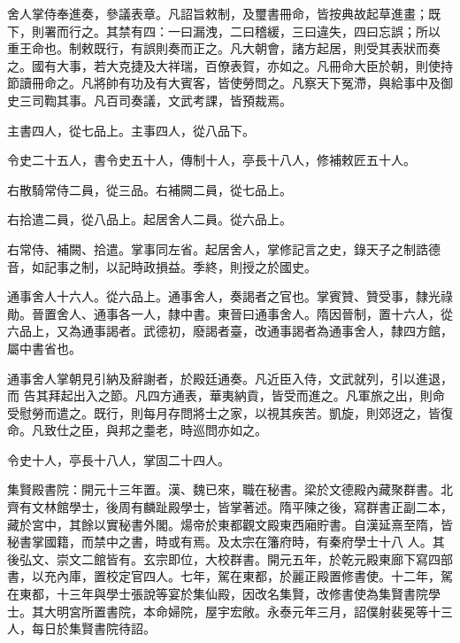 \begin{pinyinscope}
 舍人掌侍奉進奏，參議表章。凡詔旨敕制，及璽書冊命，皆按典故起草進畫；既下，則署而行之。其禁有四：一曰漏洩，二曰稽緩，三曰違失，四曰忘誤；所以
 重王命也。制敕既行，有誤則奏而正之。凡大朝會，諸方起居，則受其表狀而奏之。國有大事，若大克捷及大祥瑞，百僚表賀，亦如之。凡冊命大臣於朝，則使持節讀冊命之。凡將帥有功及有大賓客，皆使勞問之。凡察天下冤滯，與給事中及御史三司鞫其事。凡百司奏議，文武考課，皆預裁焉。



 主書四人，從七品上。主事四人，從八品下。



 令史二十五人，書令史五十人，傳制十人，亭長十八人，修補敕匠五十人。



 右散騎常侍二員，從三品。右補闕二員，從七品上。



 右拾遣二員，從八品上。起居舍人二員。從六品上。



 右常侍、補闕、拾遣。掌事同左省。起居舍人，掌修記言之史，錄天子之制誥德音，如記事之制，以記時政損益。季終，則授之於國史。



 通事舍人十六人。從六品上。通事舍人，奏謁者之官也。掌賓贊、贊受事，隸光祿勛。晉置舍人、通事各一人，隸中書。東晉曰通事舍人。隋因晉制，置十六人，從六品上，又為通事謁者。武德初，廢謁者臺，改通事謁者為通事舍人，隸四方館，屬中書省也。



 通事舍人掌朝見引納及辭謝者，於殿廷通奏。凡近臣入侍，文武就列，引以進退，而
 告其拜起出入之節。凡四方通表，華夷納貢，皆受而進之。凡軍旅之出，則命受慰勞而遣之。既行，則每月存問將士之家，以視其疾苦。凱旋，則郊迓之，皆復命。凡致仕之臣，與邦之耋老，時巡問亦如之。



 令史十人，亭長十八人，掌固二十四人。



 集賢殿書院：開元十三年置。漢、魏已來，職在秘書。梁於文德殿內藏聚群書。北齊有文林館學士，後周有麟趾殿學士，皆掌著述。隋平陳之後，寫群書正副二本，藏於宮中，其餘以實秘書外閣。煬帝於東都觀文殿東西廂貯書。自漢延熹至隋，皆秘書掌國籍，而禁中之書，時或有焉。及太宗在籓府時，有秦府學士十八
 人。其後弘文、崇文二館皆有。玄宗即位，大校群書。開元五年，於乾元殿東廊下寫四部書，以充內庫，置校定官四人。七年，駕在東都，於麗正殿置修書使。十二年，駕在東都，十三年與學士張說等宴於集仙殿，因改名集賢，改修書使為集賢書院學士。其大明宮所置書院，本命婦院，屋宇宏敞。永泰元年三月，詔僕射裴冕等十三人，每日於集賢書院待詔。




\end{pinyinscope}
